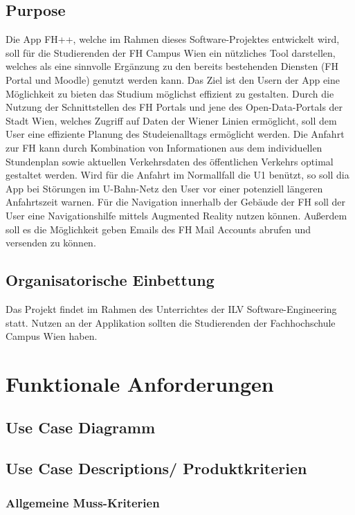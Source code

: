 \documentclass{scrreprt}
\begin{document}
\section{Purpose}
Die App FH++, welche im Rahmen dieses Software-Projektes entwickelt wird, soll für die Studierenden der FH Campus Wien ein nützliches Tool darstellen,
welches als eine sinnvolle Ergänzung zu den bereits bestehenden Diensten (FH Portal und Moodle) genutzt werden kann.
Das Ziel ist den Usern der App eine Möglichkeit zu bieten das Studium möglichst effizient zu gestalten.
Durch die Nutzung der Schnittstellen des FH Portals und jene des Open-Data-Portals der Stadt Wien, welches Zugriff auf Daten der Wiener Linien ermöglicht,
soll dem User eine effiziente Planung des Studeienalltags ermöglicht werden.
Die Anfahrt zur FH kann durch Kombination von Informationen aus dem individuellen Stundenplan sowie aktuellen Verkehrsdaten des öffentlichen Verkehrs 
optimal gestaltet werden. Wird für die Anfahrt im Normallfall die U1 benützt, so soll dia App bei Störungen im U-Bahn-Netz den User vor einer potenziell längeren
Anfahrtszeit warnen.
Für die Navigation innerhalb der Gebäude der FH soll der User eine Navigationshilfe mittels Augmented Reality nutzen können.   
Außerdem soll es die Möglichkeit geben Emails des FH Mail Accounts abrufen und versenden zu können.

\section{Organisatorische Einbettung}
Das Projekt findet im Rahmen des Unterrichtes der ILV Software-Engineering statt. Nutzen an der Applikation sollten die Studierenden der Fachhochschule Campus Wien haben.

\chapter{Funktionale Anforderungen}

\section{Use Case Diagramm}

\section{Use Case Descriptions/ Produktkriterien}
\subsection{Allgemeine Muss-Kriterien}
\end{document}
